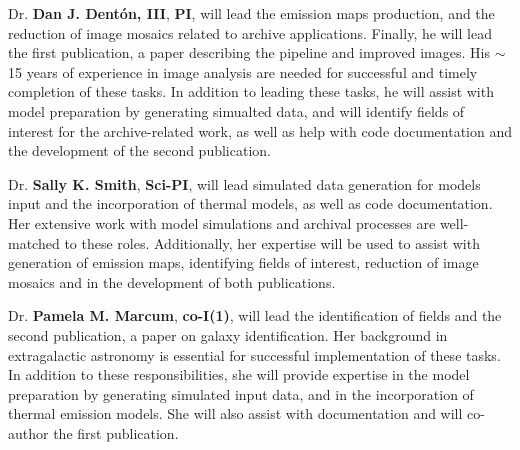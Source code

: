 %
Dr. \textbf{Dan J. Dent{\'{o}}n, III}, \textbf{PI}, will lead the emission maps production, and the reduction of image mosaics related to archive applications. Finally, he will lead the first publication, a paper describing the pipeline and improved images.  His $\sim$15 years of experience in image analysis are needed for successful and timely completion of these tasks. In addition to leading these tasks, he will assist with model preparation by generating simualted data, and will identify fields of interest for the archive-related work, as well as help with code documentation and the development of the second publication. \par
Dr. \textbf{Sally K. Smith}, \textbf{Sci-PI}, will lead simulated data generation for models input and the incorporation of thermal models, as well as code documentation.  Her extensive work with model simulations and archival processes are well-matched to these roles.  Additionally, her expertise will be used to assist with generation of emission maps, identifying fields of interest, reduction of image mosaics and in the development of both publications. \par
Dr. \textbf{Pamela M. Marcum}, \textbf{co-I(1)}, will lead the identification of fields and the second publication, a paper on galaxy identification.  Her background in extragalactic astronomy is essential for successful implementation of these tasks. In addition to these responsibilities, she will provide expertise in the model preparation by generating simulated input data, and in the incorporation of thermal emission models.  She will also assist with documentation and will co-author the first publication. \par